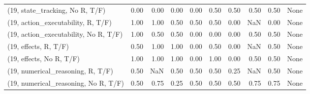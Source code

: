 \begin{table*}[h!]
\begin{adjustbox}{width=2\columnwidth,center}
\begin{tabular}{lrrr|rrr|rrr}
(19, state\_tracking, No R, T/F)       &                      0.00 &                  0.00 &                      0.00 &                          0.00 &                      0.50 &                          0.50 &                                   0.50 &                               0.50 &                                  None \\
(19, action\_executability, R, T/F)    &                      1.00 &                  1.00 &                      0.50 &                          0.50 &                      0.50 &                          0.00 &                                    NaN &                               0.00 &                                  None \\
(19, action\_executability, No R, T/F) &                      1.00 &                  0.50 &                      0.50 &                          0.00 &                      0.00 &                          0.00 &                                   0.50 &                               0.50 &                                  None \\
(19, effects, R, T/F)                 &                      0.50 &                  1.00 &                      1.00 &                          0.00 &                      0.50 &                          0.00 &                                    NaN &                               0.50 &                                  None \\
(19, effects, No R, T/F)              &                      1.00 &                  1.00 &                      1.00 &                          0.00 &                      1.00 &                          0.00 &                                   0.50 &                               0.50 &                                  None \\
(19, numerical\_reasoning, R, T/F)     &                      0.50 &                   NaN &                      0.50 &                          0.50 &                      0.50 &                          0.25 &                                    NaN &                               0.50 &                                  None \\
(19, numerical\_reasoning, No R, T/F)  &                      0.50 &                  0.75 &                      0.25 &                          0.50 &                      0.50 &                          0.50 &                                   0.75 &                               0.75 &                                  None \\

\end{tabular}
\end{adjustbox}
\end{table*}
